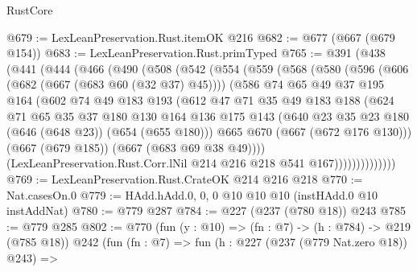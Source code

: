 \begin{lexlean}{RustCore}
\begin{coremodule}
@679 := LexLeanPreservation.Rust.itemOK @216
@682 := @677 (@667 (@679 @154))
@683 := LexLeanPreservation.Rust.primTyped
@765 := @391
    (@438
      (@441
        (@444
          (@466
            (@490
              (@508
                (@542
                  (@554
                    (@559
                      (@568
                        (@580
                          (@596
                            (@606 (@682 (@667 (@683 @60 (@32 @37) @45))))
                            (@586
                              @74
                              @65
                              @49
                              @37
                              @195
                              @164
                              (@602
                                @74
                                @49
                                @183
                                @193
                                (@612
                                  @47
                                  @71
                                  @35
                                  @49
                                  @183
                                  @188
                                  (@624
                                    @71
                                    @65
                                    @35
                                    @37
                                    @180
                                    @130
                                    @164
                                    @136
                                    @175
                                    @143
                                    (@640 @23 @35 @23 @180 (@646 (@648 @23)) (@654 (@655 @180)))
                                    @665
                                    @670
                                    (@667 (@672 @176 @130)))
                                  (@667 (@679 @185))
                                  (@667 (@683 @69 @38 @49))))
                              (LexLeanPreservation.Rust.Corr.lNil
                                @214
                                @216
                                @218
                                @541
                                @167))))))))))))))
@769 := LexLeanPreservation.Rust.CrateOK @214 @216 @218
@770 := Nat.casesOn.{0}
@779 := HAdd.hAdd.{0, 0, 0} @10 @10 @10 (instHAdd.{0} @10 instAddNat)
@780 := @779 @287
@784 := @227 (@237 (@780 @18)) @243
@785 := @779 @285
@802 := @770
    (fun (y : @10) => (fn : @7) -> (h : @784) -> @219 (@785 @18))
    @242
    (fun (fn : @7) =>
    fun (h : @227 (@237 (@779 Nat.zero @18)) @243) =>

\end{coremodule}
\end{lexlean}
